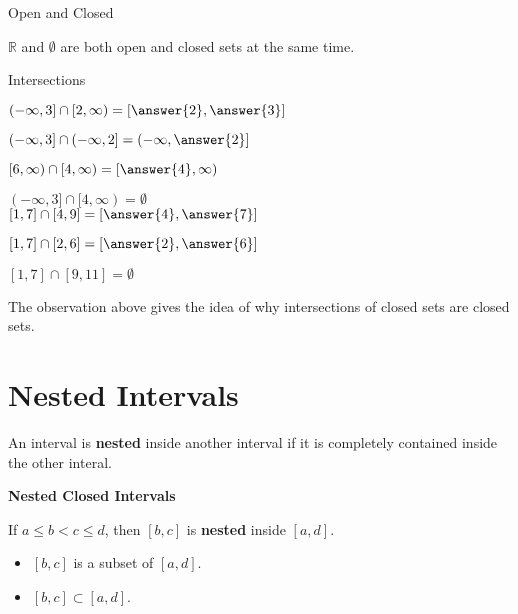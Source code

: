 \documentclass{ximera}
\begin{document}
\begin{fact} Open and Closed

$\mathbb{R}$ and $\emptyset$ are both open and closed sets at the same time.


\end{fact}






\begin{observation} Intersections

$(-\infty, 3] \cap  [2, \infty) = \left[\answer{2}, \answer{3}\right]$

$(-\infty, 3] \cap  (-\infty, 2] = \left(-\infty, \answer{2}\right]$

$[6, \infty)  \cap  [4, \infty) = \left[\answer{4}, \infty\right)$

$(-\infty, 3] \cap  [4, \infty) = \emptyset$ \\






$[1, 7] \cap  [4, 9] = \left[\answer{4}, \answer{7}\right]$

$[1, 7] \cap  [2, 6] = \left[\answer{2}, \answer{6}\right]$

$[1, 7] \cap  [9, 11] = \emptyset$


\end{observation}


The observation above gives the idea of why intersections of closed sets are closed sets.
















\section{Nested Intervals}


An interval is \textbf{nested} inside another interval if it is completely contained inside the other interal.





\textbf{Nested Closed Intervals}

If $a \leq b < c \leq d$, then $[b,c]$ is \textbf{\textcolor{purple!85!blue}{nested}} inside $[a,d]$.   

\begin{itemize}
\item $[b,c]$ is a subset of $[a,d]$.  
\item $[b,c] \subset [a,d]$.
\end{itemize}
\end{document}
